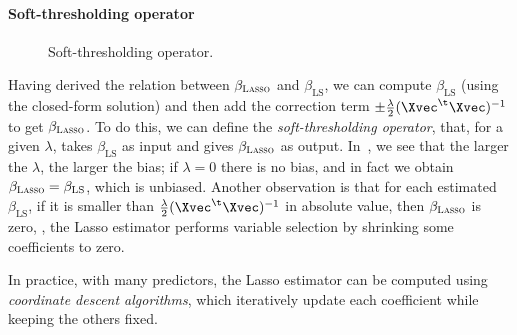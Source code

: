 \paragraph{Soft-thresholding operator}

\begin{figure}[tb]
    \centering
    \caption{Soft-thresholding operator.}\label{fig:soft-thresholding-operator}
\end{figure}

Having derived the relation between $\beta_{\textsc{Lasso}}$ and $\beta_{\text{LS}}$, we can compute $\beta_{\text{LS}}$ (using the closed-form solution) and then add the correction term $\pm \frac{\lambda}{2} (\Xvec^\t \Xvec)^{-1}$ to get $\beta_{\textsc{Lasso}}$. To do this, we can define the \emph{soft-thresholding operator}, that, for a given $\lambda$, takes $\beta_{\text{LS}}$ as input and gives $\beta_{\textsc{Lasso}}$ as output.
 In~, we see that the larger the $\lambda$, the larger the bias; if $\lambda = 0$ there is no bias, and in fact we obtain $\beta_{\textsc{Lasso}} = \beta_{\text{LS}}$, which is unbiased. Another observation is that for each estimated $\beta_{\text{LS}}$, if it is smaller than $\frac{\lambda}{2} (\Xvec^\t \Xvec)^{-1}$ in absolute value, then $\beta_{\textsc{Lasso}}$ is zero, \ie, the Lasso estimator performs variable selection by shrinking some coefficients to zero.

In practice, with many predictors, the Lasso estimator can be computed using \emph{coordinate descent algorithms}, which iteratively update each coefficient while keeping the others fixed.